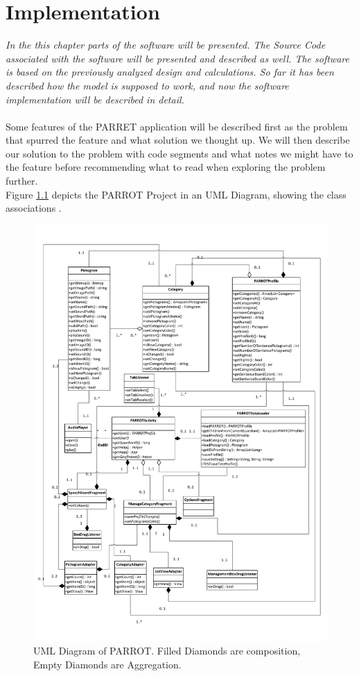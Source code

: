 \chapter{Implementation}
\label{imp}
\textit{In the this chapter parts of the software will be presented. The Source Code associated with the software will be presented and described as well. The software is based on the previously analyzed design and calculations. So far it has been described how the model is supposed to work, and now the software implementation will be described in detail.}\\
\\
Some features of the PARRET application will be described first as the problem that spurred the feature and what solution we thought up. 
We will then describe our solution to the problem with code segments and what notes we might have to the feature before recommending what to read when exploring the problem further.\\

Figure \ref{fig:ClassUMLPARROTPDF} depicts the PARROT Project in an UML Diagram, showing the class associations .

\begin{figure}
	\centering
		\includegraphics[width=1.0\textwidth]{input/images/ClassUMLPARROTPDF.pdf}
	\caption{UML Diagram of PARROT. Filled Diamonds are composition, Empty Diamonds are Aggregation.}
	\label{fig:ClassUMLPARROTPDF}
\end{figure}


